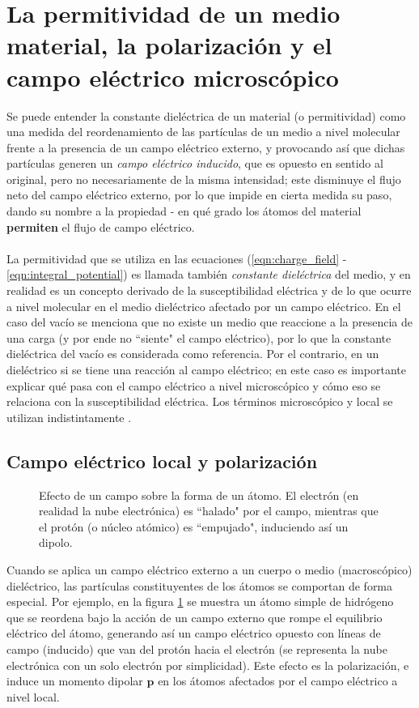\documentclass[12pt, twoside, onehalfspace, numbers, spanish]{ezthesis}
\numberwithin{equation}{section}
\begin{document}
\section{La permitividad de un medio material, la polarización y el campo eléctrico microscópico}\label{Sec:perm_polarization_mic_E_field}
Se puede entender la constante dieléctrica de un material (o permitividad) como una medida del reordenamiento de las partículas de un medio a nivel molecular frente a la presencia de un campo eléctrico externo, y provocando así que dichas partículas generen un \textit{campo eléctrico inducido}, que es opuesto en sentido al original, pero no necesariamente de la misma intensidad; este disminuye el flujo neto del campo eléctrico externo, por lo que impide en cierta medida su paso, dando su nombre a la propiedad - en qué grado los átomos del material \textbf{permiten} el flujo de campo eléctrico.\\\\
La permitividad que se utiliza en las ecuaciones (\ref{eqn:charge_field} - \ref{eqn:integral_potential}) es llamada también \textit{constante dieléctrica} del medio, y en realidad es un concepto derivado de la susceptibilidad eléctrica y de lo que ocurre a nivel molecular en el medio dieléctrico afectado por un campo eléctrico. En el caso del vacío se menciona que no existe un medio que reaccione a la presencia de una carga (y por ende no ``siente" el campo eléctrico), por lo que la constante dieléctrica del vacío es considerada como referencia. Por el contrario, en un dieléctrico si se tiene una reacción al campo eléctrico; en este caso es importante explicar qué pasa con el campo eléctrico a nivel microscópico y cómo eso se relaciona con la susceptibilidad eléctrica. Los términos microscópico y local se utilizan indistintamente \cite{Kantorovich}.

\subsection{Campo eléctrico local y polarización}\label{subsec:Local_Field}
\begin{figure}[h]
\centering

\caption{Efecto de un campo sobre la forma de un átomo. El electrón (en realidad la nube electrónica) es ``halado" por el campo, mientras que el protón (o núcleo atómico) es ``empujado", induciendo así un dipolo.}
\label{fig:Polarization}
\end{figure}
\noindent
Cuando se aplica un campo eléctrico externo a un cuerpo o medio (macroscópico) dieléctrico, las partículas constituyentes de los átomos se comportan de forma especial. Por ejemplo, en la figura \ref{fig:Polarization} se muestra un átomo simple de hidrógeno que se reordena bajo la acción de un campo externo que rompe el equilibrio eléctrico del átomo, generando así un campo eléctrico opuesto con líneas de campo (inducido) que van del protón hacia el electrón (se representa la nube electrónica con un solo electrón por simplicidad). Este efecto es la polarización, e induce un momento dipolar $\mathbf{p}$ en los átomos afectados por el campo eléctrico a nivel local.
\end{document}

